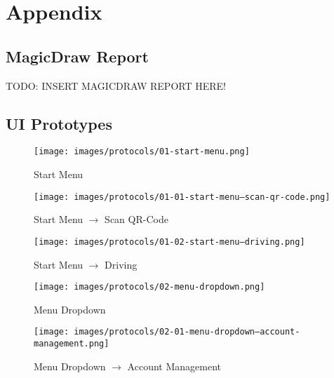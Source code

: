 \documentclass[a4paper, 12pt]{article}
\begin{document}
\listoffigures

\newpage


\section{Appendix}

\subsection{MagicDraw Report}
\color{red}TODO: INSERT MAGICDRAW REPORT HERE!\color{black}

\newpage
\subsection{UI Prototypes}
\begin{figure} [htbp]
  \begin{center}
    \texttt{[image: images/protocols/01-start-menu.png]}
  \end{center}
  \caption{Start Menu}
\end{figure}

\begin{figure} [htbp]
  \begin{center}
    \texttt{[image: images/protocols/01-01-start-menu--scan-qr-code.png]}
  \end{center}
  \caption{Start Menu $\rightarrow$ Scan QR-Code}
\end{figure}

\begin{figure} [htbp]
  \begin{center}
    \texttt{[image: images/protocols/01-02-start-menu---driving.png]}
  \end{center}
  \caption{Start Menu $\rightarrow$ Driving}
\end{figure}

\begin{figure} [htbp]
  \begin{center}
    \texttt{[image: images/protocols/02-menu-dropdown.png]}
  \end{center}
  \caption{Menu Dropdown}
\end{figure}

\begin{figure} [htbp]
  \begin{center}
    \texttt{[image: images/protocols/02-01-menu-dropdown--account-management.png]}
  \end{center}
  \caption{Menu Dropdown $\rightarrow$ Account Management}
\end{figure}
\end{document}
